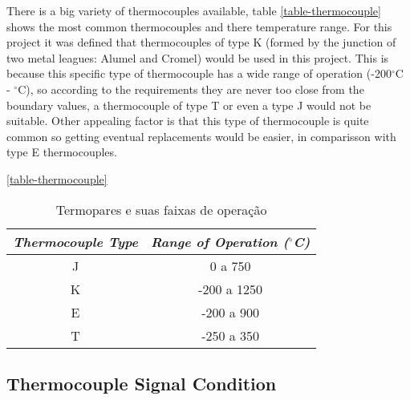 		There is a big variety of thermocouples available, table \ref{table-thermocouple} shows the most common thermocouples and there temperature range. For this project it was defined that thermocouples of type K (formed by the junction of two metal leagues: Alumel and Cromel) would be used in this project. This is because this specific type of thermocouple has a wide range of operation (-200$^{\circ}$C - $^{\circ}$C), so according to the requirements they are never too close from the boundary values, a thermocouple of type T or even a type J would not be suitable. Other appealing factor is that this type of thermocouple is quite common so getting eventual replacements would be easier, in comparisson with type E thermocouples.
		 
		\begin{table}[h!]
			\centering
			\caption{Termopares e suas faixas de operação}
			\ref{table-thermocouple}
			\begin{tabular}{|c|c|}
			\hline
			\textit{\textbf{Thermocouple Type}} & \textit{\textbf{Range of Operation ($^{\circ}$C)}} \\ \hline
			J & 0 a 750 \\ \hline
			K & -200 a 1250 \\ \hline
			E & -200 a 900 \\ \hline
			T & -250 a 350 \\ \hline
			\end{tabular}
		\end{table}

	\subsection{Thermocouple Signal Condition}